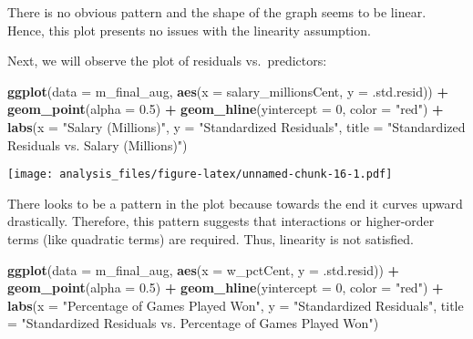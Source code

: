 \documentclass[]{article}
\newenvironment{Shaded}{\begin{snugshade}}{\end{snugshade}}
\newcommand{\DataTypeTok}[1]{\textcolor[rgb]{0.13,0.29,0.53}{#1}}
\newcommand{\DecValTok}[1]{\textcolor[rgb]{0.00,0.00,0.81}{#1}}
\newcommand{\FloatTok}[1]{\textcolor[rgb]{0.00,0.00,0.81}{#1}}
\newcommand{\KeywordTok}[1]{\textcolor[rgb]{0.13,0.29,0.53}{\textbf{#1}}}
\newcommand{\NormalTok}[1]{#1}
\newcommand{\OperatorTok}[1]{\textcolor[rgb]{0.81,0.36,0.00}{\textbf{#1}}}
\newcommand{\StringTok}[1]{\textcolor[rgb]{0.31,0.60,0.02}{#1}}
\begin{document}
There is no obvious pattern and the shape of the graph seems to be
linear. Hence, this plot presents no issues with the linearity
assumption.

Next, we will observe the plot of residuals vs.~predictors:

\begin{Shaded}
\begin{Highlighting}[]
\KeywordTok{ggplot}\NormalTok{(}\DataTypeTok{data =}\NormalTok{ m_final_aug, }\KeywordTok{aes}\NormalTok{(}\DataTypeTok{x =}\NormalTok{ salary_millionsCent, }\DataTypeTok{y =}\NormalTok{ .std.resid)) }\OperatorTok{+}
\StringTok{  }\KeywordTok{geom_point}\NormalTok{(}\DataTypeTok{alpha =} \FloatTok{0.5}\NormalTok{) }\OperatorTok{+}\StringTok{ }
\StringTok{  }\KeywordTok{geom_hline}\NormalTok{(}\DataTypeTok{yintercept =} \DecValTok{0}\NormalTok{, }\DataTypeTok{color =} \StringTok{"red"}\NormalTok{) }\OperatorTok{+}
\StringTok{  }\KeywordTok{labs}\NormalTok{(}\DataTypeTok{x =} \StringTok{"Salary (Millions)"}\NormalTok{, }\DataTypeTok{y =} \StringTok{"Standardized Residuals"}\NormalTok{, }
       \DataTypeTok{title =} \StringTok{"Standardized Residuals vs. Salary (Millions)"}\NormalTok{)}
\end{Highlighting}
\end{Shaded}

\texttt{[image: analysis\_files/figure-latex/unnamed-chunk-16-1.pdf]}

There looks to be a pattern in the plot because towards the end it
curves upward drastically. Therefore, this pattern suggests that
interactions or higher-order terms (like quadratic terms) are required.
Thus, linearity is not satisfied.

\begin{Shaded}
\begin{Highlighting}[]
\KeywordTok{ggplot}\NormalTok{(}\DataTypeTok{data =}\NormalTok{ m_final_aug, }\KeywordTok{aes}\NormalTok{(}\DataTypeTok{x =}\NormalTok{ w_pctCent, }\DataTypeTok{y =}\NormalTok{ .std.resid)) }\OperatorTok{+}
\StringTok{  }\KeywordTok{geom_point}\NormalTok{(}\DataTypeTok{alpha =} \FloatTok{0.5}\NormalTok{) }\OperatorTok{+}\StringTok{ }
\StringTok{  }\KeywordTok{geom_hline}\NormalTok{(}\DataTypeTok{yintercept =} \DecValTok{0}\NormalTok{, }\DataTypeTok{color =} \StringTok{"red"}\NormalTok{) }\OperatorTok{+}
\StringTok{  }\KeywordTok{labs}\NormalTok{(}\DataTypeTok{x =} \StringTok{"Percentage of Games Played Won"}\NormalTok{, }\DataTypeTok{y =} \StringTok{"Standardized Residuals"}\NormalTok{, }
       \DataTypeTok{title =} \StringTok{"Standardized Residuals vs. Percentage of Games Played Won"}\NormalTok{)}
\end{Highlighting}
\end{Shaded}
\end{document}
